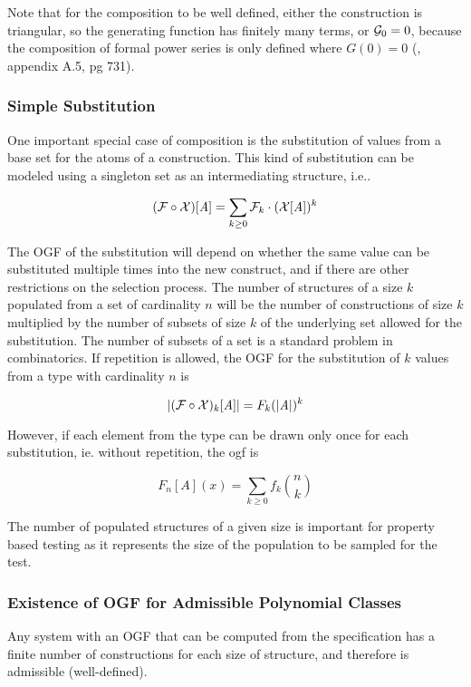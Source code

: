 \noindent 
Note that for the composition to be well defined,
either the construction is triangular, so the generating function has finitely many terms,
or $\mathcal{G}_{0} = 0$,
because the composition of formal power series 
is only defined where $G(0) = 0$ 
(\cite{WilfGeneratingFunctionology}, \cite{FlajoletSedgewick2009} appendix A.5, pg 731).

\subsubsection{Simple Substitution}

One important special case of composition
is the substitution of values from a base set for the atoms of a construction.
This kind of substitution can be modeled using a singleton set as an intermediating structure, i.e..

\begin{equation}
(\mathcal{F} \circ \mathcal{X}) [\mathit{A}]  =  \sum_{k \ge 0} \mathcal{F}_{k} \cdot (\mathcal{X} [\mathit{A}])^k
\end{equation}

The OGF of the substitution will depend on
whether the same value can be substituted multiple times into the new construct,
and if there are other restrictions on the selection process.
The number of structures of a size $k$ populated from a set of cardinality $n$ will be 
the number of constructions of size $k$ multiplied by 
the number of subsets of size $k$ of the underlying set allowed for the substitution.
The number of subsets of a set is a standard problem in combinatorics.
If repetition is allowed, the OGF for the substitution of $k$ values from 
a type with cardinality $n$ is 

$$ \lvert(\mathcal{F} \circ \mathcal{X})_{k}[\mathit{A}]\rvert = F_k (\lvert\mathit{A}\rvert)^k $$

However, if each element from the type can be drawn only once for each substitution,
ie. without repetition, the ogf is

\begin{equation}
F_n[A](x) = \sum_{k \ge 0} f_{k} \binom{n}{k}
\end{equation}

The number of populated structures of a given size
is important for property based testing
as it represents the size of the population to be sampled for the test.

\subsubsection{Existence of OGF for Admissible Polynomial Classes}
Any system with an OGF that can be computed from the specification
has a finite number of constructions for each size of structure,
and therefore is admissible (well-defined).

